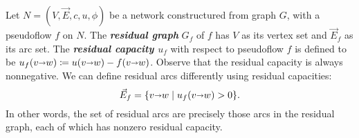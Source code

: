 \documentclass[a4paper,UKenglish]{socg-lipics-v2018}
\makeatletter
\def\note#1{\textcolor{red}{{#1}}}
\def\fsupply{\phi}
\def\arcto{\mathord\shortrightarrow}
\def\arc#1#2{#1\arcto#2}
\theoremstyle{plain}
\numberwithin{figure}{section}
\def\EMPH#1{\textbf{\emph{\boldmath #1}}}
\def\n@te#1{\textsf{\boldmath \textbf{$\langle\!\langle$#1$\rangle\!\rangle$}}\leavevmode}
\def\note#1{\textcolor{red}{\n@te{#1}}}
\makeatother
\begin{document}
Let $N = (V,\vec{E},c,u,\fsupply)$ be a network constructured from graph $G$, with a pseudoflow $f$ on $N$.
The \EMPH{residual graph} $G_f$ of $f$ has $V$ as its vertex set and $\vec{E}_f$ as its arc set.
%
The \EMPH{residual capacity $u_f$} with respect to
pseudoflow $f$ is defined to be $u_f(\arc vw) \coloneqq u(\arc vw) - f(\arc vw)$.
Observe that the residual capacity is always nonnegative.
We can define residual arcs differently using residual capacities:
\[
\vec{E}_f = \{\arc vw \mid u_f(\arc vw) > 0\}.
\]
In other words, the set of residual arcs  are precisely those arcs in the residual graph, each of which has nonzero residual capacity.
%
%
%
\end{document}
